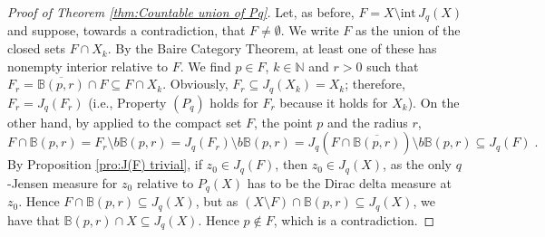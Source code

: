\documentclass[12pt]{amsart}
\numberwithin{equation}{section}
{\theoremstyle{definition}
\newtheorem{remark}[theorem]{Remark}
}
\begin{document}
\begin{proof}[Proof of Theorem \ref{thm:Countable union of Pq}]
Let, as before, $F=X\setminus\textrm{int}\, J_q(X)$ and suppose, towards a contradiction, that $F\neq \emptyset$. We write $F$ as the union of the closed sets $F\cap X_k$. By the Baire Category Theorem, at least one of these has nonempty interior relative to $F$. We find $p\in F$, $k\in\mathbb{N}$ and $r>0$ such that $F_r=\overline{\mathbb{B}(p,r)}\cap F\subseteq F\cap X_k$. Obviously, $F_r\subseteq J_q(X_k)=X_k$; therefore, $F_r=J_q(F_r)$ (i.e., Property $(P_q)$ holds for $F_r$ because it holds for $X_k$). On the other hand, by \cite[Lemma 4.12]{St10} applied to the compact set $F$, the point $p$ and the radius $r$,
$$F\cap \mathbb{B}(p,r)=F_r\setminus b\mathbb{B}(p,r)=J_q(F_r)\setminus b\mathbb{B}(p,r)=J_q(F\cap \overline{\mathbb{B}(p,r)})\setminus b\mathbb{B}(p,r)\subseteq J_q(F)\;.$$
By Proposition \ref{pro:J(F) trivial}, if $z_0\in J_q(F)$, then $z_0\in J_q(X)$, as the only $q$-Jensen measure for $z_0$ relative to $P_q(X)$ has to be the Dirac delta measure at $z_0$. Hence $F\cap \mathbb{B}(p,r)\subseteq J_q(X)$, but as $(X\setminus F) \cap \mathbb{B}(p,r)\subseteq J_q(X)$, we have that $\mathbb{B}(p,r)\cap X\subseteq J_q(X)$. Hence $p\not\in F$, which is a contradiction.
\end{proof}

















\end{document}
